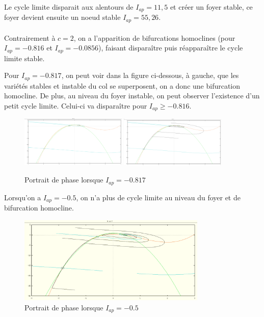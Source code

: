 \documentclass{article}
\begin{document}
Le cycle limite disparait aux alentours de  $I_{ap}=11,5$ et créer un foyer stable, ce foyer devient ensuite un noeud stable $I_{ap}=55,26$.


\paragraph*{}

Contrairement à $c = 2$, on a l'apparition de bifurcations homoclines (pour $I_{ap} = -0.
816$ et $I_{ap} = -0.0856$), faisant disparaître puis réapparaître le cycle limite stable.


Pour $I_{ap} = -0.817$, on peut voir dans la figure ci-dessous, à gauche, que les variétés stables et instable du col se superposent, on a donc une bifurcation homocline. De plus, au niveau du foyer instable, on peut observer l'existence d'un petit cycle limite. Celui-ci va disparaître pour $I_{ap} \geq -0.816$.
\begin{figure}[H]
    \centering

    \includegraphics[width=0.45\textwidth]{I-0_817bis.png}
    \includegraphics[width=0.45\textwidth]{I-0_817.png}

    \caption{Portrait de phase lorsque $I_{ap} = -0.817$ }
\end{figure}

Lorsqu'on a $I_{ap} = -0.5$, on n'a plus de cycle limite au niveau du foyer et de bifurcation homocline.
\begin{figure}[H]
    \centering
    \includegraphics[width=0.8\textwidth]{I-0_5.png}
    \caption{Portrait de phase lorsque $I_{ap} = -0.5$ }
\end{figure}
\end{document}
